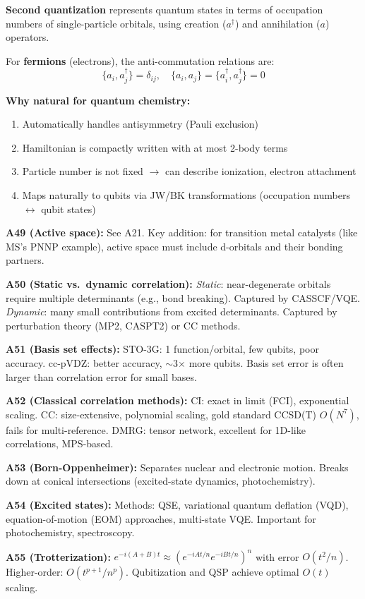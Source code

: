 \documentclass[11pt,a4paper]{article}
\begin{document}
\begin{answerbox}
\textbf{Second quantization} represents quantum states in terms of occupation numbers of single-particle orbitals, using creation ($a^\dagger$) and annihilation ($a$) operators.

For \textbf{fermions} (electrons), the anti-commutation relations are:
\[
\{a_i, a_j^\dagger\} = \delta_{ij}, \quad \{a_i, a_j\} = \{a_i^\dagger, a_j^\dagger\} = 0
\]

\textbf{Why natural for quantum chemistry:}
\begin{enumerate}
    \item Automatically handles antisymmetry (Pauli exclusion)
    \item Hamiltonian is compactly written with at most 2-body terms
    \item Particle number is not fixed $\to$ can describe ionization, electron attachment
    \item Maps naturally to qubits via JW/BK transformations (occupation numbers $\leftrightarrow$ qubit states)
\end{enumerate}
\end{answerbox}

\begin{answerbox}
\textbf{A49 (Active space):} See A21. Key addition: for transition metal catalysts (like MS's PNNP example), active space must include d-orbitals and their bonding partners.

\textbf{A50 (Static vs.\ dynamic correlation):} \textit{Static}: near-degenerate orbitals require multiple determinants (e.g., bond breaking). Captured by CASSCF/VQE. \textit{Dynamic}: many small contributions from excited determinants. Captured by perturbation theory (MP2, CASPT2) or CC methods.

\textbf{A51 (Basis set effects):} STO-3G: 1 function/orbital, few qubits, poor accuracy. cc-pVDZ: better accuracy, $\sim$3$\times$ more qubits. Basis set error is often larger than correlation error for small bases.

\textbf{A52 (Classical correlation methods):} CI: exact in limit (FCI), exponential scaling. CC: size-extensive, polynomial scaling, gold standard CCSD(T) $O(N^7)$, fails for multi-reference. DMRG: tensor network, excellent for 1D-like correlations, MPS-based.

\textbf{A53 (Born-Oppenheimer):} Separates nuclear and electronic motion. Breaks down at conical intersections (excited-state dynamics, photochemistry).

\textbf{A54 (Excited states):} Methods: QSE, variational quantum deflation (VQD), equation-of-motion (EOM) approaches, multi-state VQE. Important for photochemistry, spectroscopy.

\textbf{A55 (Trotterization):} $e^{-i(A+B)t} \approx (e^{-iAt/n} e^{-iBt/n})^n$ with error $O(t^2/n)$. Higher-order: $O(t^{p+1}/n^p)$. Qubitization and QSP achieve optimal $O(t)$ scaling.
\end{answerbox}
\end{document}
